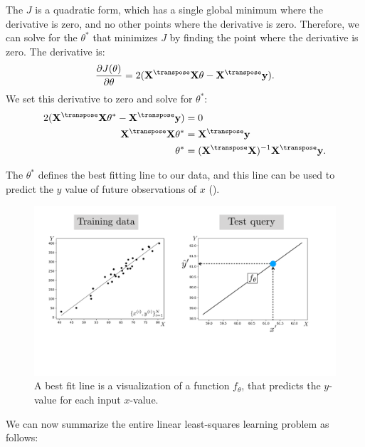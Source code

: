 The $J$ is a quadratic form, which has a single global minimum where the derivative is zero, and no other points where the derivative is zero. Therefore, we can solve for the $\theta^*$ that minimizes $J$ by finding the point where the derivative is zero. The derivative is:
\begin{align}
    \frac{\partial J(\theta)}{\partial \theta} =  2(\mathbf{X}^\transpose \mathbf{X} \theta - \mathbf{X}^\transpose \mathbf{y}).
\end{align}
We set this derivative to zero and solve for $\theta^*$:
\begin{align}
    2(\mathbf{X}^\transpose \mathbf{X} \theta^* - \mathbf{X}^\transpose \mathbf{y}) &= 0\\
\mathbf{X}^\transpose \mathbf{X} \theta^* &= \mathbf{X}^\transpose \mathbf{y}\\
\theta^* &= (\mathbf{X}^\transpose\mathbf{X})^{-1}\mathbf{X}^\transpose\mathbf{y}.
\end{align}

The $\theta^*$ defines the best fitting line to our data, and this line can be used to predict the $y$ value of future observations of $x$ (\fig{\ref{fig:intro_to_learning:ols_fit}}).

\begin{figure}[h]
    \centerline{
    \includegraphics[width=1\linewidth]{./figures/intro_to_learning/ols_fit.pdf}
    }
    \caption{A best fit line is a visualization of a function $f_{\theta}$, that predicts the $y$-value for each input $x$-value.}
    \label{fig:intro_to_learning:ols_fit}
\end{figure}

We can now summarize the entire linear least-squares learning problem as follows:

